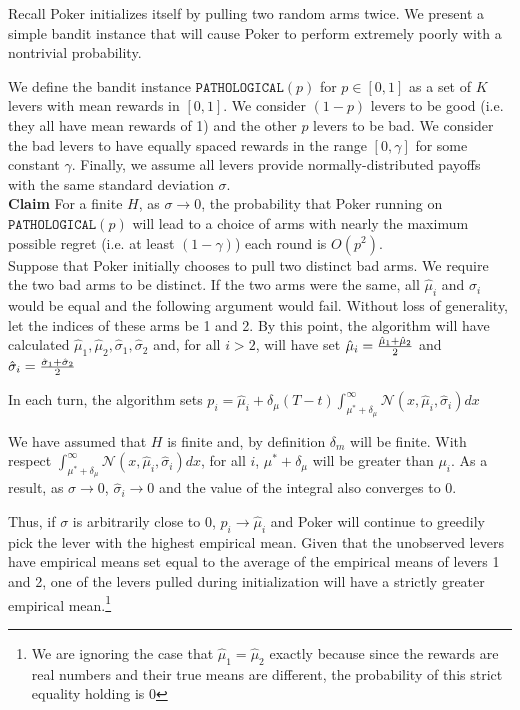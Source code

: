 \documentclass[12pt]{article}
\begin{document}
Recall Poker initializes itself by pulling two random arms twice. We present a simple bandit instance that will cause Poker to perform extremely poorly with a nontrivial probability.

We define the bandit instance $\texttt{PATHOLOGICAL}(p)$ for $p \in [0,1]$ as a set of $K$ levers with mean rewards in $[0,1]$. We consider $(1-p)$ levers to be good (i.e. they all have mean rewards of 1) and the other $p$ levers to be bad. We consider the bad levers to have equally spaced rewards in the range $[0,\gamma]$ for some constant $\gamma$. Finally, we assume all levers provide normally-distributed payoffs with the same standard deviation $\sigma$. \\

\noindent
\textbf{Claim} For a finite $H$, as $\sigma \rightarrow 0$, the probability that Poker running on $\texttt{PATHOLOGICAL}(p)$ will lead to a choice of arms with nearly the maximum possible regret (i.e. at least $(1-\gamma)$) each round is $O(p^{2})$. \\ 

Suppose that Poker initially chooses to pull two distinct bad arms. We require the two bad arms to be distinct. If the two arms were the same, all $\hat{\mu}_{i}$ and $\hat{\sigma}_{i}$ would be equal and the following argument would fail. Without loss of generality, let the indices of these arms be 1 and 2. By this point, the algorithm will have calculated $\hat{\mu}_{1}, \hat{\mu}_{2}, \hat{\sigma}_{1},\hat{\sigma}_{2}$ and, for all $i > 2$, will have set $\hat{\mu}_{i}= {\hat{\mu}_{1}+\hat{\mu}_{2}\over 2}$ and $\hat{\sigma}_{i} = {\hat{\sigma}_{1}+\hat{\sigma}_{2}\over 2}$

In each turn, the algorithm sets $p_{i} = \hat{\mu}_{i} + \delta_{\mu}(T-t)\int_{\mu^{*}+\delta_{\mu}}^{\infty}\mathcal{N}(x,\hat{\mu}_{i}, \hat{\sigma}_{i})dx$

We have assumed that $H$ is finite and, by definition $\delta_{m}$ will be finite. With respect $\int_{\mu^{*}+\delta_{\mu}}^{\infty}\mathcal{N}(x,\hat{\mu}_{i}, \hat{\sigma}_{i})dx$, for all $i$, $\mu^{*}+\delta_{\mu}$ will be greater than $\mu_{i}$. As a result, as $\sigma \to 0$, $\hat{\sigma}_{i} \to 0$ and the value of the integral also converges to 0.

Thus, if $\sigma$ is arbitrarily close to $0$, $p_{i} \rightarrow \hat{\mu}_{i}$ and Poker will continue to greedily pick the lever with the highest empirical mean. Given that the unobserved levers have empirical means set equal to the average of the empirical means of levers 1 and 2, one of the levers pulled during initialization will have a strictly greater empirical mean.\footnote{We are ignoring the case that $\hat{\mu}_{1} = \hat{\mu}_{2}$ exactly because since the rewards are real numbers and their true means are different, the probability of this strict equality holding is 0}
\end{document}
